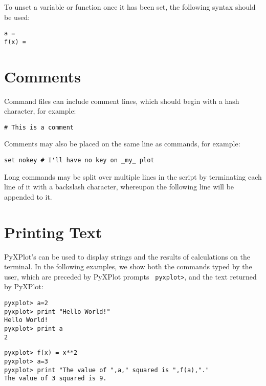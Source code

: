 
\noindent To unset a variable or function once it has been set, the following
syntax should be
used:

\begin{verbatim}
a =
f(x) =
\end{verbatim}

\section{Comments}

Command files can include comment lines, which should begin with a hash
character, for example:

\begin{verbatim}
# This is a comment
\end{verbatim}

\noindent Comments may also be placed on the same line as commands, for
example:

\begin{verbatim}
set nokey # I'll have no key on _my_ plot
\end{verbatim}

Long commands may be split over multiple lines in the script by terminating
each line of it with a backslash character, whereupon the following line will
be appended to it.

\section{Printing Text}
\label{sec:string_subs_op}

PyXPlot's  can be used to display strings and the results of
calculations on the terminal. In the following examples, we show both the
commands typed by the user, which are preceded by PyXPlot prompts {\tt
pyxplot>}, and the text returned by PyXPlot:

\begin{verbatim}
pyxplot> a=2
pyxplot> print "Hello World!"
Hello World!
pyxplot> print a
2
\end{verbatim}

\begin{verbatim}
pyxplot> f(x) = x**2
pyxplot> a=3
pyxplot> print "The value of ",a," squared is ",f(a),"."
The value of 3 squared is 9.
\end{verbatim}

